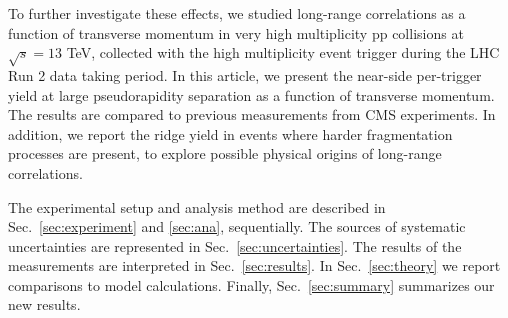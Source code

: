 % 

To further investigate these effects, we studied long-range correlations as a function of transverse momentum in very high multiplicity pp collisions at $\sqrt{s} =13$ TeV, collected with the high multiplicity event trigger during the LHC Run 2 data taking period. In this article, we present the near-side per-trigger yield at large pseudorapidity separation as a function of transverse momentum. The results are compared to previous measurements from CMS experiments. In addition, we report the ridge yield in events where harder fragmentation processes are present, to explore possible physical origins of long-range correlations.


The experimental setup and analysis method are described in Sec.~\ref{sec:experiment} and \ref{sec:ana}, sequentially.  The sources of systematic uncertainties are represented in Sec.~\ref{sec:uncertainties}. The results of the measurements are interpreted in Sec.~\ref{sec:results}. In Sec.~\ref{sec:theory} we report comparisons to model calculations.
Finally, Sec.~\ref{sec:summary} summarizes our new results.

